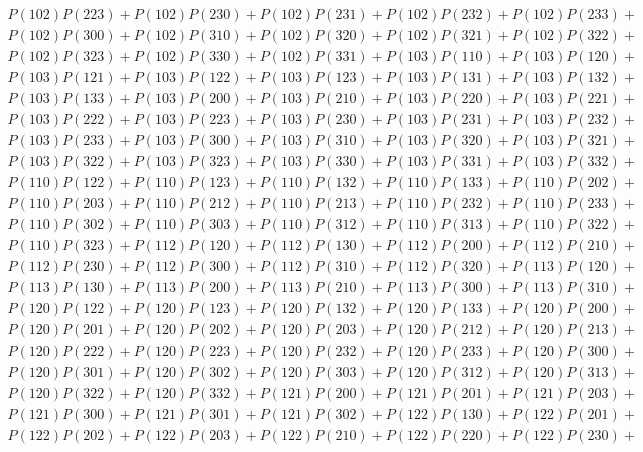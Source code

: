 \documentclass{article}
\theoremstyle{definition}
\begin{document}
\begin{gather*}
        P(102)P(223) + P(102)P(230) + P(102)P(231) + P(102)P(232) + P(102)P(233) +\\
        P(102)P(300) + P(102)P(310) + P(102)P(320) + P(102)P(321) + P(102)P(322) +\\
        P(102)P(323) + P(102)P(330) + P(102)P(331) + P(103)P(110) + P(103)P(120) +\\
        P(103)P(121) + P(103)P(122) + P(103)P(123) + P(103)P(131) + P(103)P(132) +\\
        P(103)P(133) + P(103)P(200) + P(103)P(210) + P(103)P(220) + P(103)P(221) +\\
        P(103)P(222) + P(103)P(223) + P(103)P(230) + P(103)P(231) + P(103)P(232) +\\
        P(103)P(233) + P(103)P(300) + P(103)P(310) + P(103)P(320) + P(103)P(321) +\\
        P(103)P(322) + P(103)P(323) + P(103)P(330) + P(103)P(331) + P(103)P(332) +\\
        P(110)P(122) + P(110)P(123) + P(110)P(132) + P(110)P(133) + P(110)P(202) +\\
        P(110)P(203) + P(110)P(212) + P(110)P(213) + P(110)P(232) + P(110)P(233) +\\
        P(110)P(302) + P(110)P(303) + P(110)P(312) + P(110)P(313) + P(110)P(322) +\\
        P(110)P(323) + P(112)P(120) + P(112)P(130) + P(112)P(200) + P(112)P(210) +\\
        P(112)P(230) + P(112)P(300) + P(112)P(310) + P(112)P(320) + P(113)P(120) +\\
        P(113)P(130) + P(113)P(200) + P(113)P(210) + P(113)P(300) + P(113)P(310) +\\
        P(120)P(122) + P(120)P(123) + P(120)P(132) + P(120)P(133) + P(120)P(200) +\\
        P(120)P(201) + P(120)P(202) + P(120)P(203) + P(120)P(212) + P(120)P(213) +\\
        P(120)P(222) + P(120)P(223) + P(120)P(232) + P(120)P(233) + P(120)P(300) +\\
        P(120)P(301) + P(120)P(302) + P(120)P(303) + P(120)P(312) + P(120)P(313) +\\
        P(120)P(322) + P(120)P(332) + P(121)P(200) + P(121)P(201) + P(121)P(203) +\\
        P(121)P(300) + P(121)P(301) + P(121)P(302) + P(122)P(130) + P(122)P(201) +\\
        P(122)P(202) + P(122)P(203) + P(122)P(210) + P(122)P(220) + P(122)P(230) +\\

\end{gather*}
\end{document}
